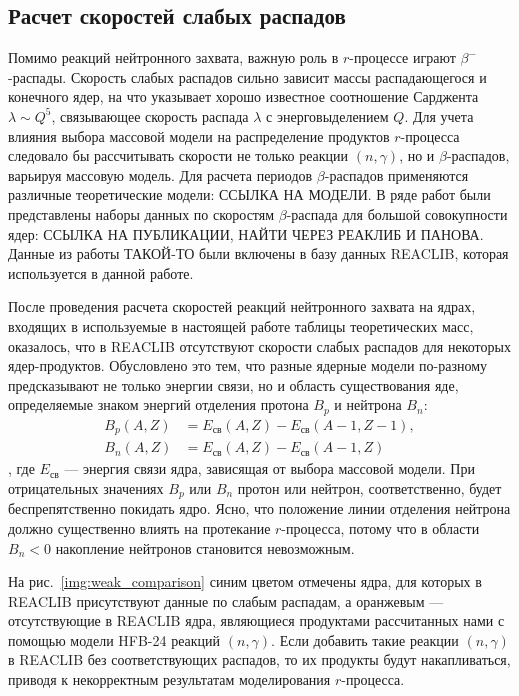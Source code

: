 \subsection{Расчет скоростей слабых распадов} \label{sec:weakfit}

  Помимо реакций нейтронного захвата, важную роль в $r$-процессе играют $\beta^-$-распады. Скорость слабых распадов сильно зависит массы распадающегося и конечного ядер, на что указывает хорошо известное соотношение Сарджента $\lambda \sim Q^5$, связывающее скорость распада $\lambda$ с энерговыделением $Q$. Для учета влияния выбора массовой модели на распределение продуктов $r$-процесса следовало бы рассчитывать скорости не только реакции $(n,\gamma)$, но и $\beta$-распадов, варьируя массовую модель. Для расчета периодов $\beta$-распадов применяются различные теоретические модели: ССЫЛКА НА МОДЕЛИ. В ряде работ были представлены наборы данных по скоростям $\beta$-распада для большой совокупности ядер: ССЫЛКА НА ПУБЛИКАЦИИ, НАЙТИ ЧЕРЕЗ РЕАКЛИБ И ПАНОВА. Данные из работы ТАКОЙ-ТО были включены в базу данных REACLIB, которая используется в данной работе.

  После проведения расчета скоростей реакций нейтронного захвата на ядрах, входящих в используемые в настоящей работе таблицы теоретических масс, оказалось, что в REACLIB отсутствуют скорости слабых распадов для некоторых ядер-продуктов.  Обусловлено это тем, что разные ядерные модели по-разному предсказывают не только энергии связи, но и область существования яде, определяемые знаком энергий отделения протона $B_p$ и нейтрона $B_n$:
  \begin{equation}\begin{aligned}\label{eq:driplines}
    B_p(A,Z) &= E_{\text{св}}(A,Z) - E_{\text{св}}(A-1,Z-1),\\
    B_n(A,Z) &= E_{\text{св}}(A,Z) - E_{\text{св}}(A-1,Z)
  \end{aligned}\end{equation},
  где $E_{\text{св}}$ --- энергия связи ядра, зависящая от выбора массовой модели. При отрицательных значениях $B_p$ или $B_n$ протон или нейтрон, соответственно, будет беспрепятственно покидать ядро. Ясно, что положение линии отделения нейтрона должно существенно влиять на протекание $r$-процесса, потому что в области $B_n < 0$ накопление нейтронов становится невозможным.

  На рис.~\ref{img:weak_comparison} синим цветом отмечены ядра, для которых в REACLIB присутствуют данные по слабым распадам, а оранжевым --- отсутствующие в REACLIB ядра, являющиеся продуктами рассчитанных нами с помощью модели HFB-24 реакций $(n,\gamma)$. Если добавить такие реакции $(n,\gamma)$ в REACLIB без соответствующих распадов, то их продукты будут накапливаться, приводя к некорректным результатам моделирования $r$-процесса.

